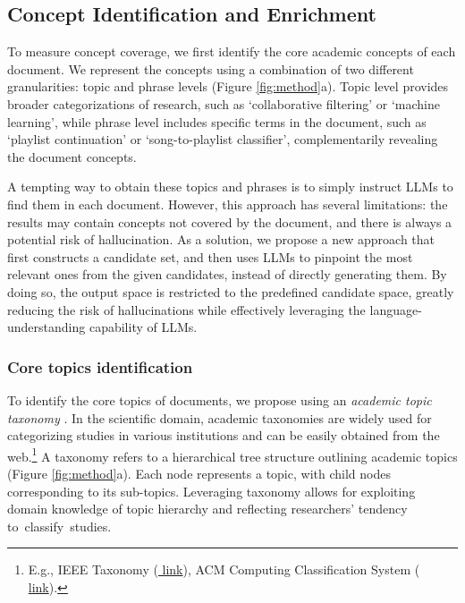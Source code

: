 \subsection{Concept Identification and Enrichment}
\label{subsec:method_a}
To measure concept coverage, we first identify the core academic concepts of each document.
We represent the concepts using a combination of two different granularities: topic and phrase levels (Figure \ref{fig:method}a).
Topic level provides broader categorizations of research, such as `collaborative filtering' or `machine learning', while phrase level includes specific terms in the document, such as `playlist continuation' or `song-to-playlist classifier', complementarily revealing the document concepts.


A tempting way to obtain these topics and phrases is to simply instruct LLMs to find them in each document.
However, this approach has several limitations:
the results may contain concepts not covered by the document, and there is always a potential risk of hallucination.
As a solution, we propose a new approach that first constructs a candidate set, and then uses LLMs to pinpoint the most relevant ones from the given candidates, instead of directly generating them.
By doing so, the output space is restricted to the predefined candidate space, greatly reducing the risk of hallucinations while effectively leveraging the language-understanding capability of LLMs.





\subsubsection{\textbf{Core topics identification}}
\label{subsub:core_topic}
To identify the core topics of documents, we propose using an \textit{academic topic taxonomy} \cite{MAG_FS}. 
In the scientific domain, academic taxonomies are widely used for categorizing studies in various institutions and can be easily obtained from the web.\footnote{E.g., IEEE Taxonomy (\href{https://www.ieee.org/content/dam/ieee-org/ieee/web/org/pubs/ieee-taxonomy.pdf}{\color{blue} link}), ACM Computing Classification System (\href{https://dl.acm.org/ccs}{\color{blue} link}).}
A taxonomy refers to a hierarchical tree structure outlining academic topics (Figure \ref{fig:method}a).
Each node represents a topic, with child nodes corresponding to its sub-topics.
Leveraging taxonomy allows for exploiting domain knowledge of topic hierarchy and reflecting researchers' tendency to~classify~studies.


